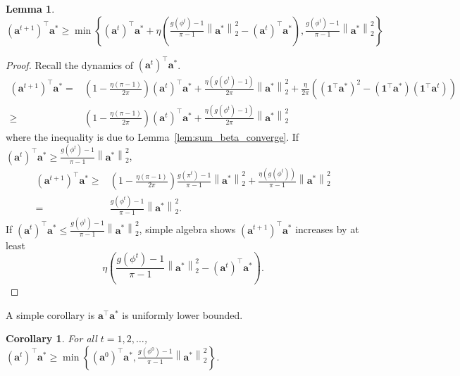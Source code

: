 \documentclass{article}
\newcommand{\secondlayer}{a}
\newcommand{\vect}[1]{\mathbf{#1}}
\newcommand{\norm}[1]{\left\|#1\right\|}
\newtheorem{lem}{Lemma}[section]
\newtheorem{cor}{Corollary}[section]
\begin{document}
\begin{lem}
$\left(\vect{\secondlayer}^{t+1}\right)^\top \vect{\secondlayer}^* \ge \min\left\{
\left(\vect{\secondlayer}^{t}\right)^\top \vect{\secondlayer}^* + \eta\left(\frac{g(\phi^t)-1}{\pi-1}\norm{\vect{\secondlayer}^*}_2^2 - \left(\vect{\secondlayer}^{t}\right)^\top \vect{\secondlayer}^*\right), \frac{g(\phi^t)-1}{\pi-1}\norm{\vect{\secondlayer}^*}_2^2
\right\}$
\end{lem}\begin{proof}
Recall the dynamics of $\left(\vect{\secondlayer}^{t}\right)^\top \vect{\secondlayer}^*$.
\begin{align*}
\left(\vect{\secondlayer}^{t+1}\right)^\top \vect{\secondlayer}^*  = & \left(1-\frac{\eta\left(\pi-1\right)}{2\pi}\right)\left(\vect{\secondlayer}^t\right)^\top \vect{\secondlayer}^* + \frac{\eta\left(g(\phi^t)-1\right)}{2\pi}\norm{\vect{\secondlayer}^*}_2^2 + \frac{\eta}{2\pi}\left(\left(\vect{1}^\top\vect{\secondlayer}^*\right)^2-\left(\vect{1}^\top\vect{\secondlayer}^*\right)\left(\vect{1}^\top \vect{\secondlayer}^t\right)\right) \\
\ge &  \left(1-\frac{\eta\left(\pi-1\right)}{2\pi}\right)\left(\vect{\secondlayer}^t\right)^\top \vect{\secondlayer}^* + \frac{\eta\left(g(\phi^t)-1\right)}{2\pi}\norm{\vect{\secondlayer}^*}_2^2
\end{align*}
where the inequality is due to Lemma~\ref{lem:sum_beta_converge}.
If $\left(\vect{\secondlayer}^t\right)^\top \vect{\secondlayer}^* \ge \frac{g(\phi^t)-1}{\pi-1}\norm{\vect{\secondlayer}^*}_2^2$, \begin{align*}
\left(\vect{\secondlayer}^{t+1}\right)^\top \vect{\secondlayer}^*  \ge & \left(1-\frac{\eta\left(\pi-1\right)}{2\pi}\right)\frac{g(\pi^t)-1}{\pi-1}\norm{\vect{\secondlayer}^*}_2^2 + \frac{\eta\left(g(\phi^t)\right)}{\pi-1}\norm{\vect{\secondlayer}^*}_2^2 \\
= &\frac{g(\phi^t)-1}{\pi-1}\norm{\vect{\secondlayer}^*}_2^2.
\end{align*}
If $\left(\vect{\secondlayer}^t\right)^\top \vect{\secondlayer}^* \le \frac{g(\phi^t)-1}{\pi-1}\norm{\vect{\secondlayer}^*}_2^2$, simple algebra shows $\left(\vect{\secondlayer}^{t+1}\right)^\top \vect{\secondlayer}^*$ increases by at least \[\eta\left(\frac{g(\phi^t)-1}{\pi-1}\norm{\vect{\secondlayer}^*}_2^2 - \left(\vect{\secondlayer}^{t}\right)^\top \vect{\secondlayer}^*\right).\]




\end{proof}
A simple corollary is $\vect{\secondlayer}^\top \vect{\secondlayer}^*$ is uniformly lower bounded.
\begin{cor}
For all $t=1,2,\ldots$, $\left(\vect{\secondlayer}^t\right)^\top \vect{\secondlayer}^* \ge \min\left\{\left(\vect{\secondlayer}^0\right)^\top \vect{\secondlayer}^*, \frac{g(\phi^0)-1}{\pi-1}\norm{\vect{\secondlayer}^*}_2^2\right\}$.
\end{cor}
\end{document}
